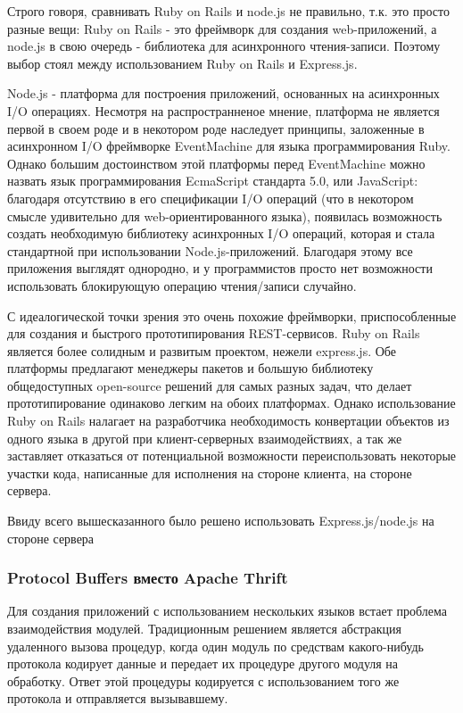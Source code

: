 \documentclass[12pt, a4paper]{article}
\begin{document}
Строго говоря, сравнивать Ruby on Rails и node.js не правильно, т.к. это просто
разные вещи: Ruby on Rails - это фреймворк для создания web-приложений, а
node.js в свою очередь - библиотека для асинхронного чтения-записи. Поэтому
выбор стоял между использованием Ruby on Rails и Express.js.

Node.js - платформа для построения приложений, основанных на асинхронных I/O
операциях. Несмотря на распространненое мнение, платформа не является первой в
своем роде и в некотором роде наследует принципы, заложенные в асинхронном I/O
фреймворке EventMachine для языка программирования Ruby. Однако большим
достоинством этой платформы перед EventMachine можно назвать язык
программирования EcmaScript стандарта 5.0, или JavaScript: благодаря отсутствию
в его спецификации I/O операций (что в некотором смысле удивительно для
web-ориентированного языка), появилась возможность создать необходимую
библиотеку асинхронных I/O операций, которая и стала стандартной при
использовании Node.js-приложений. Благодаря этому все приложения выглядят
однородно, и у программистов просто нет возможности использовать блокирующую
операцию чтения/записи случайно.

С идеалогической точки зрения это очень похожие фреймворки, приспособленные для
создания и быстрого прототипирования REST-сервисов. Ruby on Rails является более
солидным и развитым проектом, нежели express.js. Обе платформы предлагают
менеджеры пакетов и большую библиотеку общедоступных open-source решений для
самых разных задач, что делает прототипирование одинаково легким на обоих
платформах. Однако использование Ruby on Rails налагает на разработчика
необходимость конвертации объектов из одного языка в другой при клиент-серверных
взаимодействиях, а так же заставляет отказаться от потенциальной возможности
переиспользовать некоторые участки кода, написанные для исполнения на стороне
клиента, на стороне сервера.

Ввиду всего вышесказанного было решено использовать Express.js/node.js на
стороне сервера

\subsubsection{Protocol Buffers вместо Apache Thrift}
Для создания приложений с использованием нескольких языков встает проблема
взаимодействия модулей. Традиционным решением является абстракция удаленного
вызова процедур, когда один модуль по средствам какого-нибудь протокола кодирует
данные и передает их процедуре другого модуля на обработку. Ответ этой процедуры
кодируется с использованием того же протокола и отправляется вызывавшему.
\end{document}
